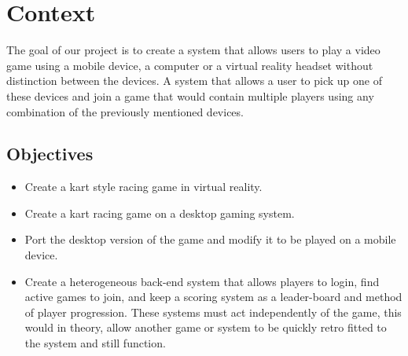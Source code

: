 
\chapter{Context}
The goal of our project is to create a system that allows users to play a video game using a mobile device, a computer or a virtual reality headset without distinction between the devices. A system that allows a user to pick up one of these devices and join a game that would contain multiple players using any combination of the previously mentioned devices.\newline

\section{Objectives}
\begin{itemize}
\item Create a kart style racing game in virtual reality.
\item Create a kart racing game on a desktop gaming system.
\item Port the desktop version of the game and modify it to be played on a mobile device.
\item Create a heterogeneous back-end system that allows players to login, find active games to join, and keep a scoring system as a leader-board and method of player progression. These systems must act independently of the game, this would in theory, allow another game or system to be quickly retro fitted to the system and still function.

\end{itemize}